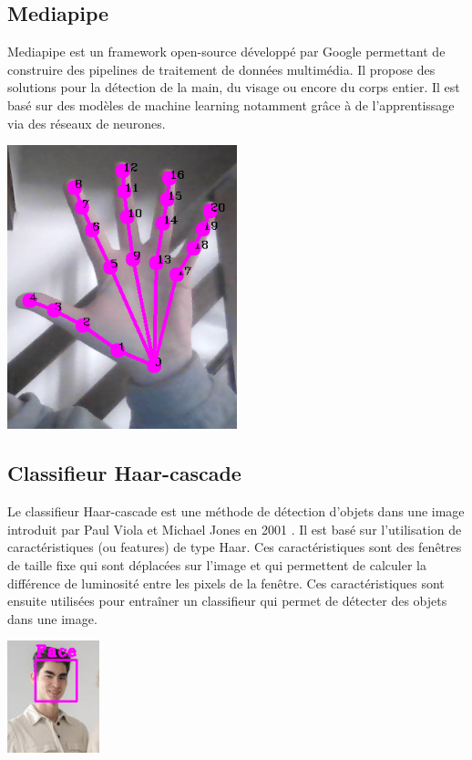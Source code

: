 \documentclass[11pt]{article}
\begin{document}
\subsection{Mediapipe}
Mediapipe \cite{mediapipe} est un framework open-source développé par Google permettant de construire des pipelines de traitement de données multimédia. Il propose des solutions pour la détection de la main, du visage ou encore du corps entier. Il est basé sur des modèles de machine learning notamment grâce à de l'apprentissage via des réseaux de neurones. \bigbreak

\begin{center}
    \includegraphics[width=0.5\textwidth]{images/mediapipe_ex.png}
\end{center}


\subsection{Classifieur Haar-cascade}
Le classifieur Haar-cascade est une méthode de détection d'objets dans une image introduit par Paul Viola et Michael Jones en 2001 \cite{viola_rapid_2001}. Il est basé sur l'utilisation de caractéristiques (ou features) de type Haar. Ces caractéristiques sont des fenêtres de taille fixe qui sont déplacées sur l'image et qui permettent de calculer la différence de luminosité entre les pixels de la fenêtre. Ces caractéristiques sont ensuite utilisées pour entraîner un classifieur qui permet de détecter des objets dans une image. \bigbreak

\begin{center}
    \includegraphics[width=0.2\textwidth]{images/visage.png}
    \label{fig:visage}
\end{center}
\end{document}
